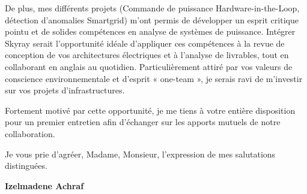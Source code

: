 \documentclass[10pt,a4paper]{../../altacv}
\begin{document}
\vspace{0.4cm}

De plus, mes différents projets (Commande de puissance Hardware-in-the-Loop, détection d'anomalies Smartgrid) m'ont permis de développer un esprit critique pointu et de solides compétences en analyse de systèmes de puissance. Intégrer Skyray serait l'opportunité idéale d'appliquer ces compétences à la revue de conception de vos architectures électriques et à l'analyse de livrables, tout en collaborant en anglais au quotidien. Particulièrement attiré par vos valeurs de conscience environnementale et d'esprit « one-team », je serais ravi de m'investir sur vos projets d'infrastructures.

\vspace{0.4cm}

Fortement motivé par cette opportunité, je me tiens à votre entière disposition pour un premier entretien afin d'échanger sur les apports mutuels de notre collaboration.

\vspace{0.5cm}

Je vous prie d'agréer, Madame, Monsieur, l'expression de mes salutations distinguées.

\vfill

\begin{flushright}
  \Large\color{emphasis}\textbf{Izelmadene Achraf}
\end{flushright}
\end{document}
